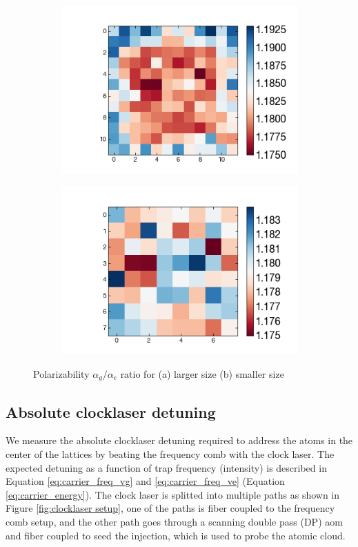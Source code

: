 \documentclass[bibnotes]{article}
\begin{document}
		\begin{figure}
		\hspace*{-2cm}
		\label{fig:pol_ratio}
		\begin{subfigure}{0.4\linewidth}
			\includegraphics[scale=0.7]{figures/pol_ratio_size6.png}
		\end{subfigure}
		\qquad\qquad\qquad\quad
		\begin{subfigure}{0.4\linewidth}
			\includegraphics[scale=0.7]{figures/pol_ratio_size4.png}
		\end{subfigure}
		\caption{Polarizability $\alpha_g/\alpha_e$ ratio for (a) larger size (b) smaller size} 
		\end{figure}


	\subsection{Absolute clocklaser detuning}
			We measure the absolute clocklaser detuning required to address the atoms in the center of the lattices by beating the frequency comb with the clock laser. The expected detuning as a function of trap frequency (intensity) is described in Equation \ref{eq:carrier_freq_vg} and \ref{eq:carrier_freq_ve} (Equation \ref{eq:carrier_energy}). The clock laser is splitted into multiple paths as shown in Figure \ref{fig:clocklaser setup}, one of the paths is fiber coupled to the frequency comb setup, and the other path goes through a scanning double pass (DP) aom and fiber coupled to seed the injection, which is used to probe the atomic cloud. 
\end{document}
